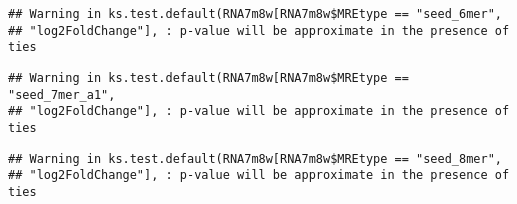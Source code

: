 \documentclass[
]{article}
\newenvironment{Shaded}{\begin{snugshade}}{\end{snugshade}}
\newcommand{\FunctionTok}[1]{\textcolor[rgb]{0.13,0.29,0.53}{\textbf{#1}}}
\newcommand{\NormalTok}[1]{#1}
\newcommand{\OtherTok}[1]{\textcolor[rgb]{0.56,0.35,0.01}{#1}}
\newcommand{\SpecialCharTok}[1]{\textcolor[rgb]{0.81,0.36,0.00}{\textbf{#1}}}
\newcommand{\StringTok}[1]{\textcolor[rgb]{0.31,0.60,0.02}{#1}}
\begin{document}
\begin{verbatim}
## Warning in ks.test.default(RNA7m8w[RNA7m8w$MREtype == "seed_6mer",
## "log2FoldChange"], : p-value will be approximate in the presence of ties
\end{verbatim}

\begin{Shaded}
\end{Shaded}

\begin{verbatim}
## Warning in ks.test.default(RNA7m8w[RNA7m8w$MREtype == "seed_7mer_a1",
## "log2FoldChange"], : p-value will be approximate in the presence of ties
\end{verbatim}

\begin{Shaded}
\end{Shaded}

\begin{verbatim}
## Warning in ks.test.default(RNA7m8w[RNA7m8w$MREtype == "seed_8mer",
## "log2FoldChange"], : p-value will be approximate in the presence of ties
\end{verbatim}

\begin{Shaded}
\end{Shaded}
\end{document}

